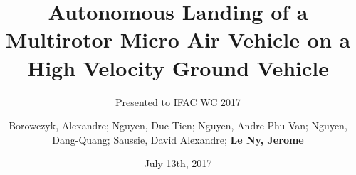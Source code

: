 \documentclass{beamer}
\title{Autonomous Landing of a Multirotor Micro Air Vehicle on a High Velocity Ground Vehicle}
\subtitle{Presented to IFAC WC 2017}
\date{July 13th, 2017}
\author{Borowczyk, Alexandre; Nguyen, Duc Tien; Nguyen, Andre Phu-Van; Nguyen, Dang-Quang; Saussie, David Alexandre; \textbf{Le Ny, Jerome}}
\begin{document}
  \maketitle
  
  \begin{frame}
    \tableofcontents
  \end{frame}






   
  
\end{document}
